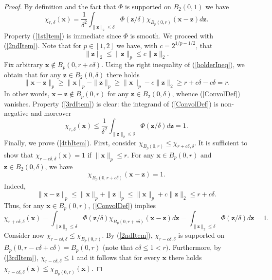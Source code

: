 \documentclass{amsart}
\numberwithin{equation}{section}
\begin{document}
\begin{proof}
By definition and the fact that $\Phi$ is supported on $B_2(0,1)$ we have
\begin{equation}
    \label{ConvolDef}
    \chi_{r,\delta}(\boldsymbol{x})=\frac{1}{\delta^2}\int_{\|\boldsymbol{z}\|_2\le\delta}\Phi(\boldsymbol{z}/\delta)\chi_{B_p(0,r)}(\boldsymbol{x}-\boldsymbol{z})d\boldsymbol{z}.
\end{equation}
Property (\ref{1stItem}) is immediate since $\Phi$ is smooth.
We proceed with (\ref{2ndItem}).
Note that for $p\in[1,2]$ we have, with $c=2^{1/p-1/2}$, that
\begin{equation}
    \label{holderIneq}
    \|\boldsymbol{z}\|_2\le\|\boldsymbol{z}\|_p\le c\|\boldsymbol{z}\|_2.
\end{equation}
Fix arbitrary 
$\boldsymbol{x}\notin B_p(0,r+c\delta)$. Using the right inequality of (\ref{holderIneq}), we obtain  that for any  $\boldsymbol{z}\in B_2(0,\delta)$ there holds
$$
\|\boldsymbol{x}-\boldsymbol{z}\|_p\ge\|\boldsymbol{x}\|_p-\|\boldsymbol{z}\|_p\ge\|\boldsymbol{x}\|_p-c\|\boldsymbol{z}\|_2\ge r+c\delta-c\delta=r.
$$
In other words, $\boldsymbol{x}-\boldsymbol{z}\notin B_p(0,r)$ for any $\boldsymbol{z}\in B_2(0,\delta)$, whence (\ref{ConvolDef}) vanishes.
Property (\ref{3rdItem}) is clear: the integrand of (\ref{ConvolDef}) is non-negative and moreover
$$
\chi_{r,\delta}(\boldsymbol{x})\le\frac{1}{\delta^2}\int_{\|\boldsymbol{z}\|_2\le\delta}\Phi(\boldsymbol{z}/\delta)d\boldsymbol{z}=1.
$$
Finally, we prove (\ref{4thItem}). First, consider $\chi_{B_p(0,r)}\le \chi_{r+c\delta,\delta}$. It is sufficient to show that $\chi_{r+c\delta,\delta}(\boldsymbol{x})=1$ if $\|\boldsymbol{x}\|_p\le r$. 
For any $\boldsymbol{x}\in B_p(0,r)$ and $\boldsymbol{z}\in B_2(0,\delta)$, we have
$$
\chi_{B_p(0,r+c\delta)}(\boldsymbol{x}-\boldsymbol{z})=1.
$$
Indeed,
$$
\|\boldsymbol{x}-\boldsymbol{z}\|_p\le\|\boldsymbol{x}\|_p+\|\boldsymbol{z}\|_p\le\|\boldsymbol{x}\|_p+c\|\boldsymbol{z}\|_2\le r+c\delta.
$$
Thus, for any $\boldsymbol{x}\in B_p(0,r)$, (\ref{ConvolDef}) implies
$$
\chi_{r+c\delta,\delta}(\boldsymbol{x})=\int_{\|\boldsymbol{z}\|_2\le\delta}\Phi(\boldsymbol{z}/\delta)\chi_{B_p(0,r+c\delta)}(\boldsymbol{x}-\boldsymbol{z})d\boldsymbol{z}=\int_{\|\boldsymbol{z}\|_2\le\delta}\Phi(\boldsymbol{z}/\delta)d\boldsymbol{z}=1.
$$
Consider now $\chi_{r-c\delta,\delta}\le \chi_{B_p(0,r)}$. By (\ref{2ndItem}), $\chi_{r-c\delta,\delta}$ is supported on $B_p(0,r-c\delta+c\delta)= B_p(0,r)$ (note that $c\delta\le1<r)$.
Furthermore, by (\ref{3rdItem}), $\chi_{r-c\delta,\delta}\le1$ and it follows that for every $\boldsymbol{x}$ there holds $\chi_{r-c\delta,\delta}(\boldsymbol{x})\le\chi_{B_p(0,r)}(\boldsymbol{x})$.
\end{proof}
\end{document}
